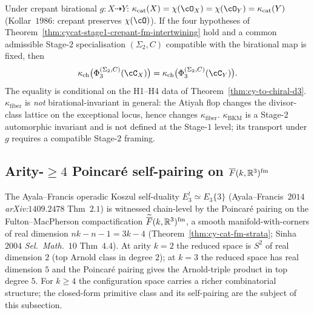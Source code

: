 \begin{remark}
\label{rem:cycat-four-kappa-crepant}
Under crepant birational $g \colon X \dashrightarrow Y$:
$\kappa_{\mathrm{cat}}(X) = \chi(\cO_X) = \chi(\cO_Y) = \kappa_{\mathrm{cat}}(Y)$
(Kollar~$1986$: crepant preserves $\chi(\cO)$). If the four hypotheses
of Theorem~\ref{thm:cycat-stage1-crepant-fm-intertwining} hold and a
common admissible Stage-$2$ specialisation $(\Sigma_2, C)$ compatible
with the birational map is fixed, then
\[
\kappa_{\mathrm{ch}}\bigl(\Phi_3^{(\Sigma_2,C)}(\cC_X)\bigr)
=
\kappa_{\mathrm{ch}}\bigl(\Phi_3^{(\Sigma_2,C)}(\cC_Y)\bigr).
\]
The equality is conditional on the H1--H4 data of
Theorem~\ref{thm:cy-to-chiral-d3}. $\kappa_{\mathrm{fiber}}$ is
\emph{not} birational-invariant in general: the Atiyah flop changes
the divisor-class lattice on the exceptional locus, hence changes
$\kappa_{\mathrm{fiber}}$. $\kappa_{\mathrm{BKM}}$ is a Stage-$2$
automorphic invariant and is not defined at the Stage-$1$ level;
its transport under $g$ requires a compatible Stage-$2$ framing.
\end{remark}

\subsection{Arity-\texorpdfstring{$\geq 4$}{>= 4} Poincar\'e self-pairing on \texorpdfstring{$\overline{F}(k, \mathbb{R}^3)^{\mathrm{fm}}$}{FM-bar(k, R^3)}}
\label{subsec:cycat-arity-ge-4-poincare}

The Ayala--Francis operadic Koszul self-duality
$E_3^! \simeq E_3\{3\}$ (Ayala--Francis~$2014$ \emph{arXiv:$1409.2478$}
Thm~$2.1$) is witnessed chain-level by the Poincar\'e pairing on the
Fulton--MacPherson compactification $\widetilde{\overline{F}}(k, \mathbb{R}^3)^{\mathrm{fm}}$,
a smooth manifold-with-corners of real dimension $nk - n - 1 = 3k - 4$
(Theorem~\ref{thm:cy-cat-fm-strata}; Sinha~$2004$ \emph{Sel.\ Math.}~$10$
Thm~$4.4$). At arity $k = 2$ the reduced space is $S^2$ of real
dimension $2$ (top Arnold class in degree $2$); at $k = 3$ the
reduced space has real dimension $5$ and the Poincar\'e pairing gives
the Arnold-triple product in top degree $5$. For $k \geq 4$ the configuration space carries
a richer combinatorial structure; the closed-form primitive class and
its self-pairing are the subject of this subsection.

